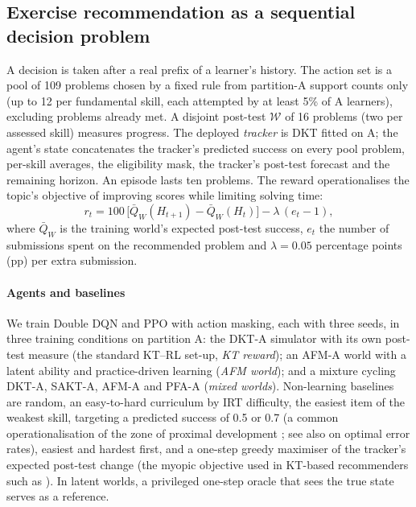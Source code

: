 \documentclass[a4paper,preprint,12pt,authoryear]{elsarticle}
\begin{document}
\subsection{Exercise recommendation as a sequential decision problem}\label{sec:mdp}

A decision is taken after a real prefix of a learner's history. The action set is a pool of 109 problems chosen by a fixed rule from partition-A support counts only (up to 12 per fundamental skill, each attempted by at least 5\% of A learners), excluding problems already met. A disjoint post-test $\mathcal W$ of 16 problems (two per assessed skill) measures progress. The deployed \emph{tracker} is DKT fitted on A; the agent's state concatenates the tracker's predicted success on every pool problem, per-skill averages, the eligibility mask, the tracker's post-test forecast and the remaining horizon. An episode lasts ten problems. The reward operationalises the topic's objective of improving scores while limiting solving time:
\begin{equation}
r_t = 100\,\bigl[\bar Q_W(H_{t+1}) - \bar Q_W(H_t)\bigr] - \lambda\,(e_t-1),
\label{eq:reward}
\end{equation}
where $\bar Q_W$ is the training world's expected post-test success, $e_t$ the number of submissions spent on the recommended problem and $\lambda=0.05$ percentage points (pp) per extra submission.

\paragraph{Agents and baselines} We train Double DQN \citep{mnih2015dqn,vanhasselt2016ddqn} and PPO \citep{schulman2017ppo} with action masking, each with three seeds, in three training conditions on partition A: the DKT-A simulator with its own post-test measure (the standard KT--RL set-up, \emph{KT reward}); an AFM-A world with a latent ability and practice-driven learning (\emph{AFM world}); and a mixture cycling DKT-A, SAKT-A, AFM-A and PFA-A (\emph{mixed worlds}). Non-learning baselines are random, an easy-to-hard curriculum by IRT difficulty, the easiest item of the weakest skill, targeting a predicted success of 0.5 or 0.7 (a common operationalisation of the zone of proximal development \citep{vygotsky1978mind}; see also \citealp{wilson2019eighty} on optimal error rates), easiest and hardest first, and a one-step greedy maximiser of the tracker's expected post-test change (the myopic objective used in KT-based recommenders such as \citet{ozyurt2025exrec}). In latent worlds, a privileged one-step oracle that sees the true state serves as a reference.
\end{document}
